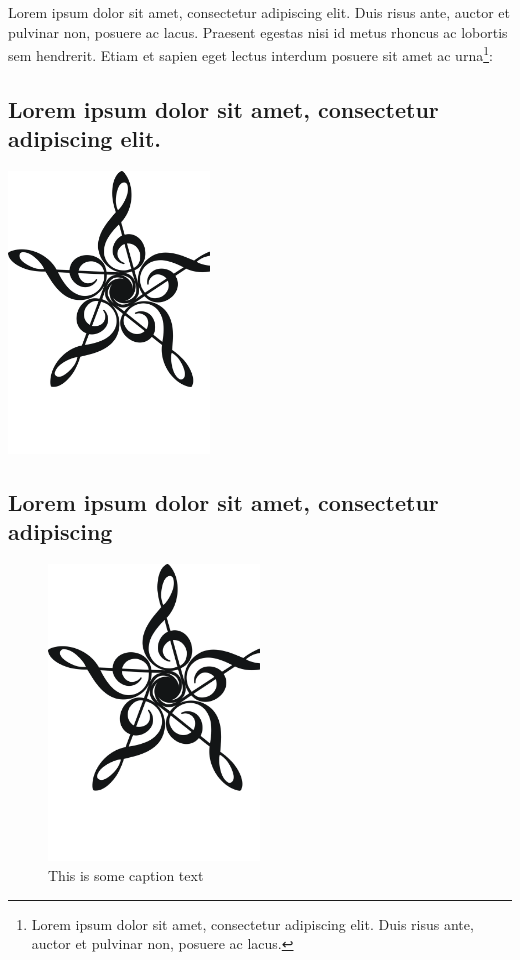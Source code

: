 \noindent Lorem ipsum dolor sit amet, consectetur adipiscing elit. Duis risus ante, auctor et pulvinar non, posuere ac lacus. Praesent egestas nisi id metus rhoncus ac lobortis sem hendrerit. Etiam et sapien eget lectus interdum posuere sit amet ac urna\footnote{Lorem ipsum dolor sit amet, consectetur adipiscing elit. Duis risus ante, auctor et pulvinar non, posuere ac lacus.}:

\subsection{Lorem ipsum dolor sit amet, consectetur adipiscing elit.}
\lipsum[1-1]

{\hfill\includegraphics[width=0.4\textwidth]{test-img.pdf}\hfill}

\lipsum[1-1]

\subsection{Lorem ipsum dolor sit amet, consectetur adipiscing}
\lipsum[1-2]

%
% 


%
%
\begin{figure}[ht]
	\centering
    \includegraphics[width=0.5\textwidth, angle=20]{test-img.pdf}
    \caption{This is some caption text}
\end{figure}
